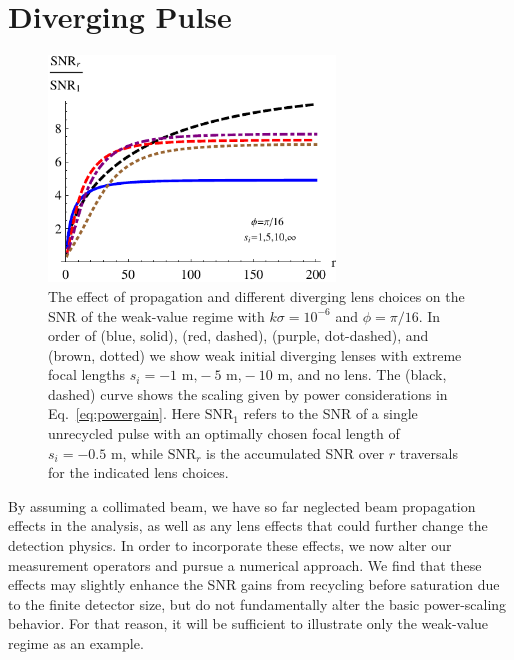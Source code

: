 \section{Diverging Pulse}\label{sec:diverging}
\begin{figure}[t]
  \centerline{\includegraphics[width=3in]{PulsedRecycling/Figures/snr_plateaus.pdf}}
  \caption[Pulsed recycling weak value amplification SNR with diffraction effects included.]{The effect of propagation and different diverging lens choices on the SNR of the weak-value regime with $k\sigma = 10^{-6}$ and $\phi = \pi/16$.  In order of (blue, solid), (red, dashed), (purple, dot-dashed), and (brown, dotted) we show weak initial diverging lenses with extreme focal lengths $s_i = -1\text{ m,} -5\text{ m,} -10\text{ m,}$ and no lens.  The (black, dashed) curve shows the scaling given by power considerations in Eq.~\eqref{eq:powergain}. Here $\text{SNR}_1$ refers to the SNR of a single unrecycled pulse with an optimally chosen focal length of $s_i = -0.5\text{ m}$, while $\text{SNR}_r$ is the accumulated SNR over $r$ traversals for the indicated lens choices. }  
  \label{fig:snrplateaus}
\end{figure}
By assuming a collimated beam, we have so far neglected beam propagation effects in the analysis, as well as any lens effects that could further change the detection physics.  In order to incorporate these effects, we now alter our measurement operators and pursue a numerical approach.  We find that these effects may slightly enhance the SNR gains from recycling before saturation due to the finite detector size, but do not fundamentally alter the basic power-scaling behavior.  For that reason, it will be sufficient to illustrate only the weak-value regime as an example.

